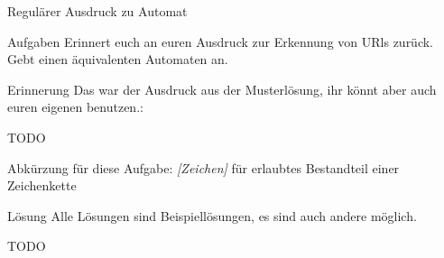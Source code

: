 {
	\begin{frame}{Regulärer Ausdruck zu Automat}
		\begin{alertblock}{Aufgaben}
			Erinnert euch an euren Ausdruck zur Erkennung von URls zurück. Gebt einen äquivalenten Automaten an.
		\end{alertblock}
		\begin{exampleblock}{Erinnerung}
			Das war der Ausdruck aus der Musterlösung, ihr könnt aber auch euren eigenen benutzen.:
			
			TODO
			
		\end{exampleblock}
		\footnotesize{Abkürzung für diese Aufgabe: \emph{[Zeichen]} für erlaubtes Bestandteil einer Zeichenkette}
	\end{frame}
}

{
	\begin{frame}{Lösung}
		Alle Lösungen sind Beispiellösungen, es sind auch andere möglich.
		
		TODO
		
	\end{frame}
}